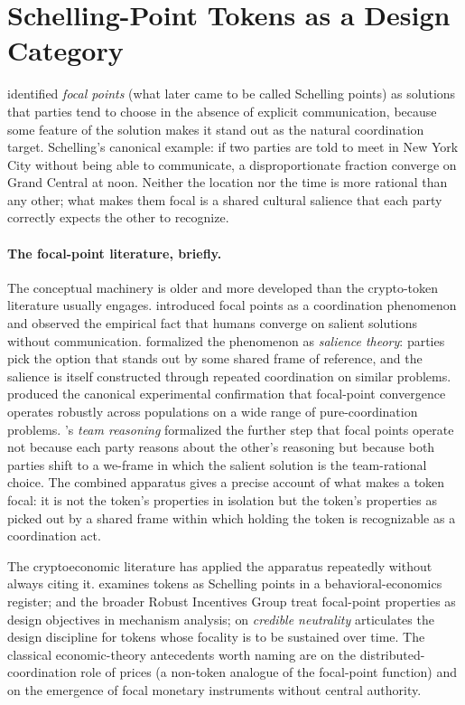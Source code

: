 \documentclass[11pt,a4paper]{article}
\theoremstyle{definition}
\theoremstyle{remark}
\begin{document}
\section{Schelling-Point Tokens as a Design Category}
\label{sec:design-category}

\citet{schelling1960strategy} identified \emph{focal points}
(what later came to be called Schelling points) as solutions that
parties tend to choose in the absence of explicit communication,
because some feature of the solution makes it stand out as the
natural coordination target. Schelling's canonical example: if
two parties are told to meet in New York City without being able
to communicate, a disproportionate fraction converge on Grand
Central at noon. Neither the location nor the time is more
rational than any other; what makes them focal is a shared
cultural salience that each party correctly expects the other to
recognize.

\paragraph{The focal-point literature, briefly.}
The conceptual machinery is older and more developed than the
crypto-token literature usually engages. \citet{schelling1960strategy}
introduced focal points as a coordination phenomenon and observed
the empirical fact that humans converge on salient solutions
without communication. \citet{sugden1995theory} formalized the
phenomenon as \emph{salience theory}: parties pick the option that
stands out by some shared frame of reference, and the salience is
itself constructed through repeated coordination on similar
problems. \citet{mehta_starmer_sugden_1994} produced the canonical
experimental confirmation that focal-point convergence operates
robustly across populations on a wide range of pure-coordination
problems. \citet{bacharach2006beyond}'s \emph{team reasoning}
formalized the further step that focal points operate not because
each party reasons about the other's reasoning but because both
parties shift to a we-frame in which the salient solution is the
team-rational choice. The combined apparatus gives a precise
account of what makes a token focal: it is not the token's
properties in isolation but the token's properties as picked out
by a shared frame within which holding the token is recognizable
as a coordination act.

The cryptoeconomic literature has applied the apparatus
repeatedly without always citing it.
\citet{markey-towler2018schelling} examines tokens as Schelling
points in a behavioral-economics register; \citet{daian_etal_2017}
and the broader Robust Incentives Group treat focal-point
properties as design objectives in mechanism analysis;
\citet{buterin2020credible} on \emph{credible neutrality}
articulates the design discipline for tokens whose focality is to
be sustained over time. The classical economic-theory antecedents
worth naming are \citet{hayek1945knowledge} on the
distributed-coordination role of prices (a non-token analogue of
the focal-point function) and \citet{selgin1988theory} on the
emergence of focal monetary instruments without central authority.
\end{document}
